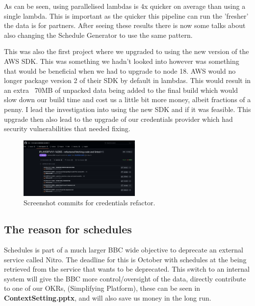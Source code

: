   As can be seen, using parallelised lambdas is 4x quicker on average than using a single lambda. This is important as the quicker this pipeline can run
  the 'fresher' the data is for partners. After seeing these results there is now some talks about also changing the Schedule Generator to use the same 
  pattern.

  \vspace{0.2cm}

  This was also the first project where we upgraded to using the new version of the AWS SDK. This was something we hadn't looked into however was something
  that would be beneficial when we had to upgrade to node 18. AWS would no longer package version 2 of their SDK by default in lambdas. This would result in
  an extra ~70MB of unpacked data being added to the final build which would slow down our build time and cost us a little bit more money, albeit fractions of
  a penny. I lead the investigation into using the new SDK and if it was feasible. This upgrade then also lead to the upgrade of our credentials provider
  which had security vulnerabilities that needed fixing.

  \begin{figure}[H]
    \centering
    \includegraphics[width=6cm]{assets/credentialsRefactorCommits.png}
    \caption{Screenshot commits for credentials refactor.}
    \label{fig:credentialsRefactor}
  \end{figure}

  \subsection{The reason for schedules}
  Schedules is part of a much larger BBC wide objective to deprecate an external service called Nitro. The deadline for this is October with 
  schedules at the being retrieved from the service that wants to be deprecated. This switch to an internal system will give the BBC more 
  control/oversight of the data, directly contribute to one of our OKRs, (Simplifying Platform), these can be seen in \textbf{ContextSetting.pptx}, 
  and will also save us money in the long run.

